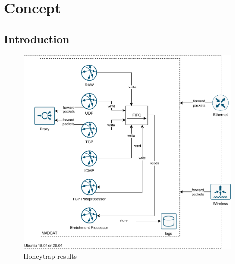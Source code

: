 \chapter{Concept}
\label{chap:concept}


\section{Introduction}

\begin{figure}[h]
    \centering
    \includegraphics[width=\textwidth]{figures/heicat-architecture.pdf}
    \caption[Honeytrap results]{Honeytrap results}
    \label{fig:madcat-architecture}
\end{figure}

